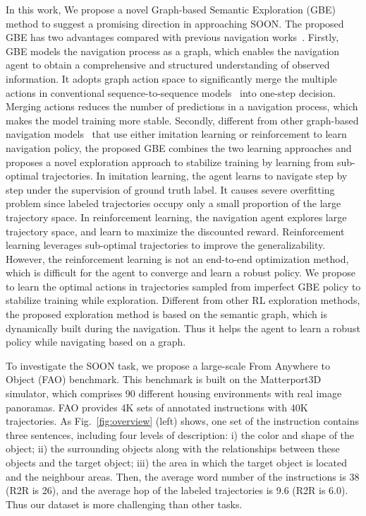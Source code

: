 \documentclass[final]{cvpr}
\begin{document}
In this work, We propose a novel Graph-based Semantic Exploration (GBE) method to suggest a promising direction in approaching SOON. 
The proposed GBE has two advantages compared with previous navigation works~\cite{anderson2018vision, fried2018speaker, wang2018reinforced}. 
Firstly, GBE models the navigation process as a graph, which enables the navigation agent to obtain a comprehensive and structured understanding of observed information. It adopts graph action space to significantly merge the multiple actions in conventional sequence-to-sequence models~\cite{anderson2018vision,fried2018speaker,wang2018reinforced} into one-step decision. 
Merging actions reduces the number of predictions in a navigation process, which makes the model training more stable. 
Secondly, different from other graph-based navigation models~\cite{deng2020evolving, chaplot2020learning} that use either imitation learning or reinforcement to learn navigation policy,
the proposed GBE combines the two learning approaches and proposes a novel exploration approach to stabilize training by learning from sub-optimal trajectories. 
In imitation learning, the agent learns to navigate step by step under the supervision of ground truth label. 
It causes severe overfitting problem since labeled trajectories occupy only a small proportion of the large trajectory space. 
In reinforcement learning, the navigation agent explores large trajectory space, and learn to maximize the discounted reward. 
Reinforcement learning leverages sub-optimal trajectories to improve the generalizability. 
However, the reinforcement learning is not an end-to-end optimization method, which is difficult for the agent to converge and learn a robust policy. 
We propose to learn the optimal actions in trajectories sampled from imperfect GBE policy to stabilize training while exploration. Different from other RL exploration methods, the proposed exploration method is based on the semantic graph, which is dynamically built during the navigation. Thus it helps the agent to learn a robust policy while navigating based on a graph. 


To investigate the SOON task, we propose a large-scale From Anywhere to Object (FAO) benchmark. This benchmark is built on the Matterport3D simulator, which comprises 90 different housing environments with real image panoramas. FAO provides 4K sets of annotated instructions with 40K trajectories. As Fig.~\ref{fig:overview} (left) shows, one set of the instruction contains three sentences, including four levels of description: i) the color and shape of the object; ii) the surrounding objects along with the relationships between these objects and the target object; iii) the area in which the target object is located and the neighbour areas. Then, the average word number of the instructions is 38 (R2R is 26), and the average hop of the labeled trajectories is 9.6 (R2R is 6.0). Thus our dataset is more challenging than other tasks. 
\end{document}
